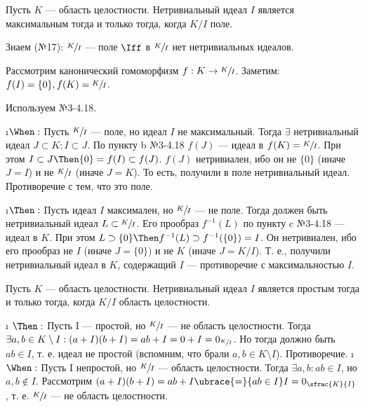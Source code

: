 \begin{problem}
Пусть $K$ --- область целостности. Нетривиальный идеал $I$ является максимальным тогда и только тогда, когда $K/I$ поле.
\end{problem}

\begin{solution}
Знаем (№17): \(\sfrac{K}{I}\) --- поле \(\Iff\) в \(\sfrac{K}{I}\) нет нетривиальных идеалов.

Рассмотрим канонический гомоморфизм \(f: K \to \sfrac{K}{I}\). Заметим: $f(I) = \{0\}, f(K) = \sfrac{K}{I}$.

Используем №3-4.18.
\begin{itemize}
\i $\When:$ Пусть $\sfrac{K}{I}$ --- поле, но идеал $I$ не максимальный. Тогда $\exists$ нетривиальный идеал $J \subset K: I \subset J$.
По пункту b №3-4.18 $f(J)$ --- идеал в $f(K) = \sfrac{K}{I}$. При этом $I \subset J \Then \{0\} = f(I) \subset f(J)$. $f(J)$ нетривиален, ибо он не $\{0\}$ (иначе $J=I$) и не $\sfrac{K}{I}$ (иначе $J=K$). То есть, получили в поле нетривиальный идеал. Противоречие с тем, что это поле.

\i $\Then:$ Пусть идеал $I$ максимален, но $\sfrac{K}{I}$ --- не поле. Тогда должен быть нетривиальный идеал $L \subset \sfrac{K}{I}$. Его прообраз $f^{-1}(L)$ по пункту c №3-4.18 --- идеал в $K$. При этом $L \supset \{0\} \Then f^{-1}(L) \supset f^{-1}(\{0\}) = I$. Он нетривиален, ибо его прообраз не $I$ (иначе $J=\{0\})$ и не $K$ (иначе $J = K/I$). Т. е., получили нетривиальный идеал в $K$, содержащий $I$ --- противоречие с максимальностью $I$.
\end{itemize}

\end{solution}

\begin{problem}[22(4.7)]
Пусть $K$ --- область целостности. Нетривиальный идеал $I$ является простым тогда и только тогда, когда $K/I$ область целостности.
\end{problem}

\begin{solution}

\begin{itemize}
\tightlist
\i
  \(\Then:\)
  Пусть I --- простой, но \(\sfrac{K}{I}\) --- не область целостности. Тогда \(\exists a, b \in K\setminus I: (a+I)(b+I) = ab+I = 0+I = 0_{\sfrac{K}{I}}\). Но тогда должно быть \(ab \in I\), т. е. идеал не простой (вспомним, что брали $a, b \in K\setminus I$). Противоречие.
\i
  \(\When:\)
  Пусть I непростой, но $\sfrac{K}{I}$ --- область целостности. Тогда \(\exists a, b: ab \in I\), но \(a, b \not\in I\). Рассмотрим \((a+I)(b+I) = ab + I \ubrace{=}{ab \in I} I = 0_{\sfrac{K}{I}}\), т. е. $\sfrac{K}{I}$ --- не область целостности.
\end{itemize}

\end{solution}

